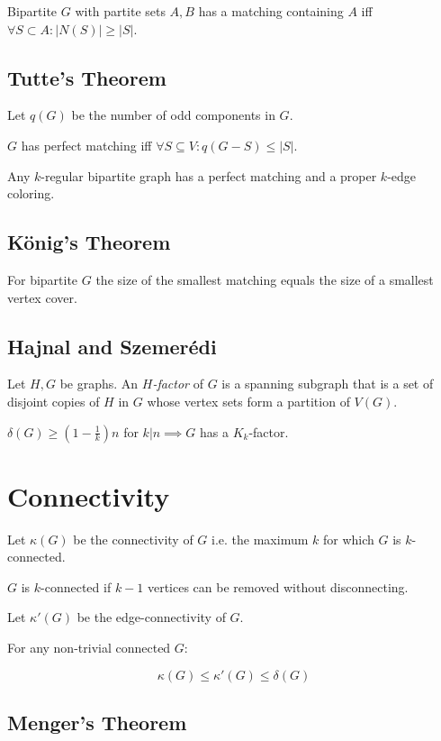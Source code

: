 Bipartite $G$ with partite sets $A, B$ has a matching containing $A$ iff $\forall S \subset A : |N(S)|\geq|S|$.

\subsection*{Tutte's Theorem}

Let $q(G)$ be the number of odd components in $G$.

$G$ has perfect matching iff $\forall S \subseteq V : q(G-S) \leq |S|$.

\spacing

Any $k$-regular bipartite graph has a perfect matching and a proper $k$-edge coloring.

\subsection*{König's Theorem}

For bipartite $G$ the size of the smallest matching equals the size of a smallest vertex cover.

\subsection*{Hajnal and Szemer\'{e}di}

Let $H, G$ be graphs. An \emph{$H$-factor} of $G$ is a spanning subgraph that is a set of disjoint copies of $H$ in $G$ whose vertex sets form a partition of $V(G)$.

\spacing

$\delta(G) \geq (1-\frac{1}{k})n$ for $k | n \implies G$ has a $K_k$-factor.

\section*{Connectivity}

Let $\kappa(G)$ be the connectivity of $G$ i.e. the maximum $k$ for which $G$ is $k$-connected.

$G$ is $k$-connected if $k-1$ vertices can be removed without disconnecting.

Let $\kappa'(G)$ be the edge-connectivity of $G$.

For any non-trivial connected $G$:

$$\kappa(G) \leq \kappa'(G) \leq \delta(G)$$

\subsection*{Menger's Theorem}


